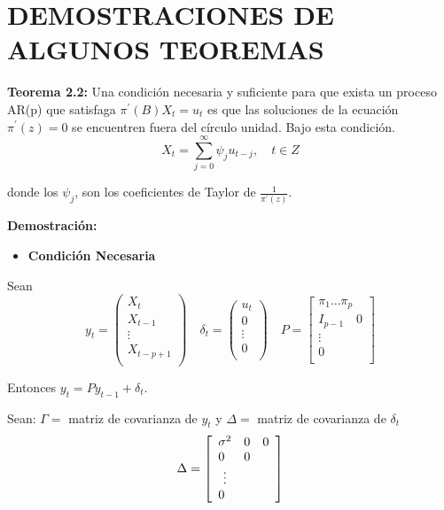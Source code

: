 \section{DEMOSTRACIONES DE ALGUNOS TEOREMAS}

\textbf{Teorema 2.2:} Una condici\'{o}n necesaria y suficiente para que exista un proceso AR(p) que satisfaga $\pi^{'}\left( B \right)X_{t} =u_{t}$ es que las soluciones de la ecuaci\'{o}n $\pi^{'}\left( z \right)=0$ se encuentren fuera del c\'{i}rculo unidad. Bajo esta condici\'{o}n.
\[
X_{t} =\sum\limits_{j=0}^\infty {\psi_{j} u_{t-j} },\quad t\in Z
\]

donde los $\psi_{j}$, son los coeficientes de Taylor de $\frac{1}{\pi^{'}\left( z \right)}$.\newline

\textbf{Demostraci\'{o}n:}

\begin{itemize}
      \item \textbf{Condici\'{o}n Necesaria} 
\end{itemize}

Sean
\[
y_{t} =\left(\begin{array}{c}
 X_{t} \\ 
 X_{t-1} \\ 
 \vdots \\ 
 X_{t-p+1} \\ 
 \end{array}\right)
\quad
\delta_{t} =\left(\begin{array}{c}
 u_{t} \\ 
 0 \\ 
 \vdots \\ 
 0 \\ 
 \end{array}\right)
\quad
P=\left[\begin{array}{c}
 \pi_{1} \ldots \pi_{p} \\ 
 I_{p-1}\quad 0\\
 \vdots\\
 0\\
\end{array} \right]
\]

Entonces $y_{t} =Py_{t-1} +\delta_{t}$.\newline

Sean: $\Gamma=$ matriz de covarianza de $y_{t}$ y $\Delta =$ matriz de covarianza de $\delta_{t}$
\[
\Delta =
\left[ {{\begin{array}{*{20}c}
 {\sigma^{2}} \hfill & 0 \hfill & 0 \hfill \\
 0  \hfill & 0  \hfill & \hfill \\
 \vdots & & \\
 0 \hfill & \hfill & \hfill \\
\end{array} }} \right]
\]

